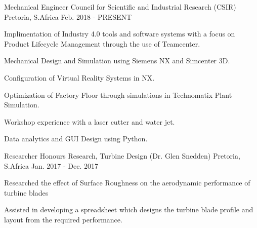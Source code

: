

\begin{cventries}

  \cventry
    {Mechanical Engineer} %
    {Council for Scientific and Industrial Research (CSIR)} %
    {Pretoria, S.Africa} %
    {Feb. 2018 - PRESENT} %
    {
      \begin{cvitems} %
        \item {Implimentation of Industry 4.0 tools and software systems with a focus on Product Lifecycle Management through the use of Teamcenter.}
        \item {Mechanical Design and Simulation using Siemens NX and Simcenter 3D.}
        \item {Configuration of Virtual Reality Systems in NX.}
        \item {Optimization of Factory Floor through simulations in Technomatix Plant Simulation.}
        \item {Workshop experience with a laser cutter and water jet.}
        \item {Data analytics and GUI Design using Python.}
      \end{cvitems}
    }

  \cventry
    {Researcher} %
    {Honours Research, Turbine Design (Dr. Glen Snedden)} %
    {Pretoria, S.Africa} %
    {Jan. 2017 - Dec. 2017} %
    {
      \begin{cvitems} %
        \item {Researched the effect of Surface Roughness on the aerodynamic performance of turbine blades}
        \item {Assisted in developing a spreadsheet which designs the turbine blade profile and layout from the required performance.}
      \end{cvitems}
    }


\end{cventries}
